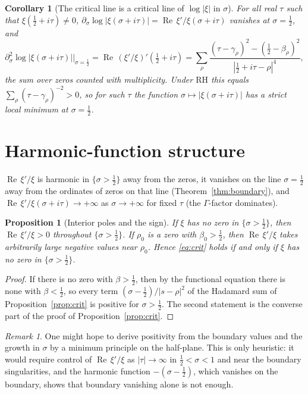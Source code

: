 \documentclass[11pt]{amsart}
\newtheorem{proposition}[theorem]{Proposition}
\newtheorem{corollary}[theorem]{Corollary}
\theoremstyle{definition}
\theoremstyle{remark}
\newtheorem{remark}[theorem]{Remark}
\newcommand{\RH}{\mathrm{RH}}
\renewcommand{\Re}{\operatorname{Re}}
\newcommand{\half}{\tfrac12}
\begin{document}
\begin{corollary}[The critical line is a critical line of $\log|\xi|$ in $\sigma$]\label{cor:min}
For all real $\tau$ such that $\xi(\half+i\tau)\neq0$,
$\partial_\sigma\log|\xi(\sigma+i\tau)|=\Re\,\xi'/\xi(\sigma+i\tau)$ vanishes at
$\sigma=\half$, and
\[
\partial_\sigma^2\log|\xi(\sigma+i\tau)|\Big|_{\sigma=\half}=\Re\,(\xi'/\xi)'(\half+i\tau)
=\sum_\rho\frac{(\tau-\gamma_\rho)^2-(\half-\beta_\rho)^2}{|\half+i\tau-\rho|^4},
\]
the sum over zeros counted with multiplicity. Under $\RH$ this equals
$\sum_\rho(\tau-\gamma_\rho)^{-2}>0$, so for such $\tau$ the function
$\sigma\mapsto|\xi(\sigma+i\tau)|$ has a strict local minimum at $\sigma=\half$.
\end{corollary}

\section{Harmonic-function structure}
$\Re\,\xi'/\xi$ is harmonic in $\{\sigma>\half\}$ away from the zeros, it vanishes
on the line $\sigma=\half$ away from the ordinates of zeros on that line
(Theorem~\ref{thm:boundary}), and $\Re\,\xi'/\xi(\sigma+i\tau)\to+\infty$ as
$\sigma\to+\infty$ for fixed $\tau$ (the $\Gamma$-factor dominates).

\begin{proposition}[Interior poles and the sign]\label{prop:minprinciple}
If $\xi$ has no zero in $\{\sigma>\half\}$, then $\Re\,\xi'/\xi>0$ throughout
$\{\sigma>\half\}$. If $\rho_0$ is a zero with $\beta_0>\half$, then
$\Re\,\xi'/\xi$ takes arbitrarily large negative values near $\rho_0$. Hence
\eqref{eq:crit} holds if and only if $\xi$ has no zero in $\{\sigma>\half\}$.
\end{proposition}
\begin{proof}
If there is no zero with $\beta>\half$, then by the functional equation there is
none with $\beta<\half$, so every term $(\sigma-\half)/|s-\rho|^2$ of the Hadamard
sum of Proposition~\ref{prop:crit} is positive for $\sigma>\half$. The second
statement is the converse part of the proof of Proposition~\ref{prop:crit}.
\end{proof}

\begin{remark}
One might hope to derive positivity from the boundary values and the growth in
$\sigma$ by a minimum principle on the half-plane. This is only heuristic: it
would require control of $\Re\,\xi'/\xi$ as $|\tau|\to\infty$ in
$\half<\sigma<1$ and near the boundary singularities, and the harmonic function
$-(\sigma-\half)$, which vanishes on the boundary, shows that boundary vanishing
alone is not enough.
\end{remark}
\end{document}
